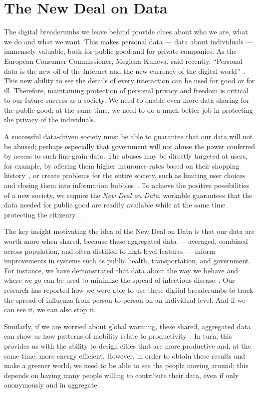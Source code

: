 \section{The New Deal on Data}

The digital breadcrumbs we leave behind provide clues about who we are, what we do and what we want.
This makes personal data --- data about individuals --- immensely valuable, both for public good and for private companies.
As the European Consumer Commissioner, Meglena Kuneva, said recently, ``Personal data is the new oil of the Internet and the new currency of the digital world''~\cite{kuneva2009}.
This new ability to see the details of every interaction can be used for good or for ill.
Therefore, maintaining protection of personal privacy and freedom is critical to our future success as a society.
We need to enable even more data sharing for the public good; at the same time, we need to do a much better job in protecting the privacy of the individuals.

A successful data-driven society must be able to guarantee that our data will not be abused; perhaps especially that government will not abuse the power conferred by access to such fine-grain data.
The abuses may be directly targeted at users, for example, by offering them higher insurance rates based on their shopping history~\cite{gittleson2013big}, or create problems for the entire society, such as limiting user choices and closing them into information bubbles~\cite{hannak2013measuring}. 
To achieve the positive possibilities of a new society, we require the \emph{New Deal on Data}, workable guarantees that the data needed for public good are readily available while at the same time protecting the citizenry~\cite{pentland2009reality}.

The key insight motivating the idea of the New Deal on Data is that our data are worth more when shared, because these aggregated data --- averaged, combined across population, and often distilled to high-level features --- inform improvements in systems such as public health, transportation, and government.
For instance, we have demonstrated that data about the way we behave and where we go can be used to minimize the spread of infectious disease~\cite{madan2010social, pentland2009using}.
Our research has reported how we were able to use these digital breadcrumbs to track the spread of influenza from person to person on an individual level.
And if we can see it, we can also stop it.

Similarly, if we are worried about global warming, these shared, aggregated data can show us how patterns of mobility relate to productivity~\cite{pan2013urban}.
In turn, this provides us with the ability to design cities that are more productive and, at the same time, more energy efficient.
However, in order to obtain these results and make a greener world, we need to be able to see the people moving around; this depends on having many people willing to contribute their data, even if only anonymously and in aggregate.

